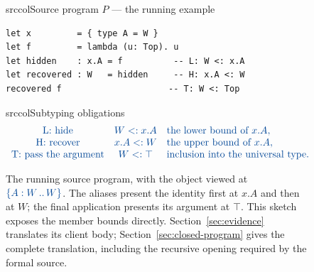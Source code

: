 \begin{figure}[!htbp]
\begin{examplepanel}{srccol}{Source program \(P\) --- the running example}
\begin{lstlisting}[style=source]
let x         = { type A = W }
let f         = lambda (u: Top). u
let hidden    : x.A = f          -- L: W <: x.A
let recovered : W   = hidden     -- H: x.A <: W
recovered f                     -- T: W <: Top
\end{lstlisting}
\end{examplepanel}
\begin{examplepanel}{srccol}{Subtyping obligations}
\[
\src{
 \begin{array}{ccl}
 \text{L: hide} & W<:x.A & \text{the lower bound of }x.A,\\
 \text{H: recover} & x.A<:W & \text{the upper bound of }x.A,\\
 \text{T: pass the argument} & W<:\top & \text{inclusion into the universal type}.
 \end{array}}
\]
\end{examplepanel}
\caption{The running source program, with the object viewed at
\(\iface{W}{W}\). The aliases present the identity first at \(x.A\)
and then at \(W\); the final application presents its argument at
\(\top\). This sketch exposes the member bounds directly.
Section~\ref{sec:evidence} translates its client body;
Section~\ref{sec:closed-program} gives the complete translation, including
the recursive opening required by the formal source.}
\label{fig:program}
\end{figure}
